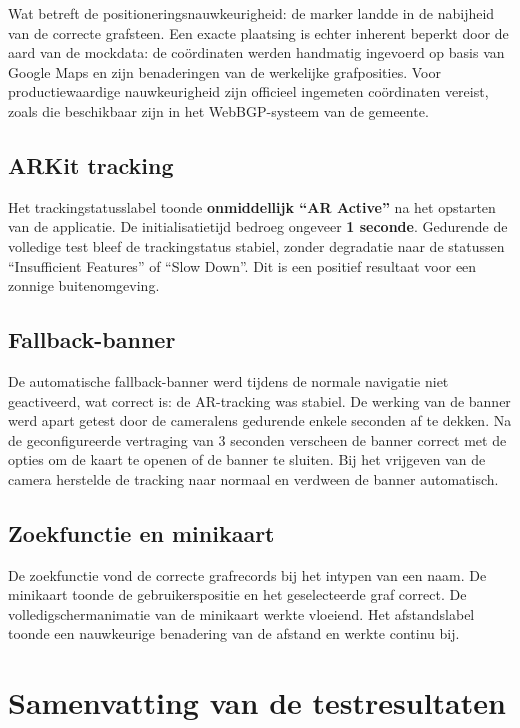 Wat betreft de positioneringsnauwkeurigheid: de marker landde in de nabijheid
van de correcte grafsteen. Een exacte plaatsing is echter inherent beperkt
door de aard van de mockdata: de coördinaten werden handmatig ingevoerd op
basis van Google Maps en zijn benaderingen van de werkelijke grafposities.
Voor productiewaardige nauwkeurigheid zijn officieel ingemeten coördinaten
vereist, zoals die beschikbaar zijn in het WebBGP-systeem van de gemeente.

\subsection{ARKit tracking}

Het trackingstatusslabel toonde \textbf{onmiddellijk ``AR Active''} na het
opstarten van de applicatie. De initialisatietijd bedroeg ongeveer
\textbf{1 seconde}. Gedurende de volledige test bleef de trackingstatus stabiel,
zonder degradatie naar de statussen ``Insufficient Features'' of ``Slow Down''.
Dit is een positief resultaat voor een zonnige buitenomgeving.

\subsection{Fallback-banner}

De automatische fallback-banner werd tijdens de normale navigatie niet
geactiveerd, wat correct is: de AR-tracking was stabiel. De werking van de
banner werd apart getest door de cameralens gedurende enkele seconden af te
dekken. Na de geconfigureerde vertraging van 3 seconden verscheen de banner
correct met de opties om de kaart te openen of de banner te sluiten. Bij het
vrijgeven van de camera herstelde de tracking naar normaal en verdween de
banner automatisch.

\subsection{Zoekfunctie en minikaart}

De zoekfunctie vond de correcte grafrecords bij het intypen van een naam. De
minikaart toonde de gebruikerspositie en het geselecteerde graf correct. De
volledigschermanimatie van de minikaart werkte vloeiend. Het afstandslabel
toonde een nauwkeurige benadering van de afstand en werkte continu bij.

\section{Samenvatting van de testresultaten}

